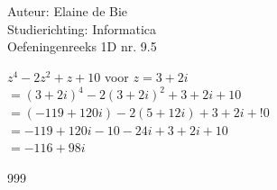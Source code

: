 \documentclass[a4paper]{article}
\begin{document}
\noindent \large Auteur: Elaine de Bie \\
\noindent \large Studierichting: Informatica\\
\noindent \large Oefeningenreeks 1D nr. 9.5\\

\medskip


\normalsize


$z^{4}-2z^2+z+10$ voor $z=3+2i$\\

$=\left(3+2i\right)^4-2\left(3+2i\right)^2+3+2i+10$\\

$=\left(-119+120i\right)-2\left(5+12i\right)+3+2i+!0$\\

$=-119+120i-10-24i+3+2i+10$\\

$=-116+98i$\\



\begin{thebibliography}{999}
\end{thebibliography}
\end{document}
